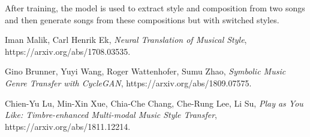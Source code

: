 \documentclass[en]{pracamgr}
\begin{document}
After training, the model is used to extract style and composition from two songs and then generate songs from these compositions but with switched styles.

\begin{thebibliography}{99}

 Iman Malik, Carl Henrik Ek, \textit{Neural Translation of Musical Style}, https://arxiv.org/abs/1708.03535.

 Gino Brunner, Yuyi Wang, Roger Wattenhofer, Sumu Zhao, \textit{Symbolic Music Genre Transfer with CycleGAN}, https://arxiv.org/abs/1809.07575.

 Chien-Yu Lu, Min-Xin Xue, Chia-Che Chang, Che-Rung Lee, Li Su, \textit{Play as You Like: Timbre-enhanced Multi-modal Music Style Transfer}, https://arxiv.org/abs/1811.12214.

\end{thebibliography}
\end{document}
